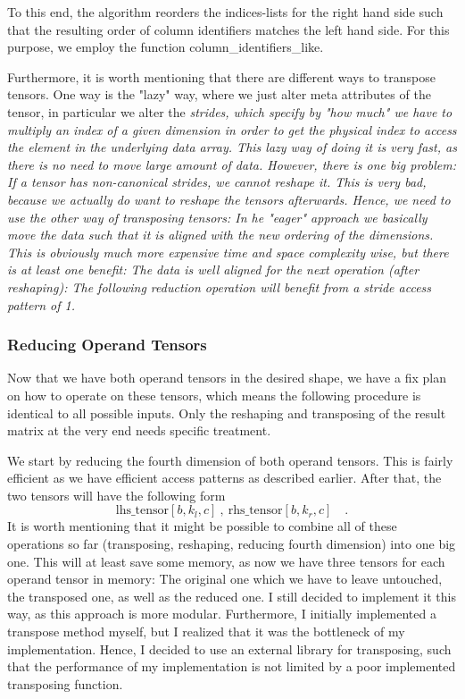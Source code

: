 \documentclass[sigconf]{acmart}
\renewcommand{\texttt}[1]{\begingroup\ttfamily\sloppy\hbadness=10000 #1\endgroup}
\begin{document}
To this end, the algorithm reorders the indices-lists for the right hand side such that the resulting order of column identifiers matches the left hand side. For this purpose, we employ the function \texttt{column\_identifiers\_like}.

Furthermore, it is worth mentioning that there are different ways to transpose tensors. One way is the "lazy" way, where we just alter meta attributes of the tensor, in particular we alter the \em strides\em , which specify by "how much" we have to multiply an index of a given dimension in order to get the physical index to access the element in the underlying data array. This lazy way of doing it is very fast, as there is no need to move large amount of data. However, there is one big problem: If a tensor has non-canonical strides, we cannot reshape it. This is very bad, because we actually do want to reshape the tensors afterwards. Hence, we need to use the other way of transposing tensors: In he "eager" approach we basically move the data such that it is aligned with the new ordering of the dimensions. This is obviously much more expensive time and space complexity wise, but there is at least one benefit: The data is well aligned for the next operation (after reshaping): The following reduction operation will benefit from a stride access pattern of 1.

\subsubsection{Reducing Operand Tensors}
Now that we have both operand tensors in the desired shape, we have a fix plan on how to operate on these tensors, which means the following procedure is identical to all possible inputs. Only the reshaping and transposing of the result matrix at the very end needs specific treatment.

We start by reducing the fourth dimension of both operand tensors. This is fairly efficient as we have efficient access patterns as described earlier. After that, the two tensors will have the following form
\[ \text{lhs\_tensor}[{b}, {k_l}, {c}] \ , \ \text{rhs\_tensor}[{b}, {k_r}, {c}] \quad . \]
It is worth mentioning that it might be possible to combine all of these operations so far (transposing, reshaping, reducing fourth dimension) into one big one. This will at least save some memory, as now we have three tensors for each operand tensor in memory: The original one which we have to leave untouched, the transposed one, as well as the reduced one. I still decided to implement it this way, as this approach is more modular. Furthermore, I initially implemented a transpose method myself, but I realized that it was the bottleneck of my implementation. Hence, I decided to use an external library for transposing, such that the performance of my implementation is not limited by a poor implemented transposing function.
\end{document}
